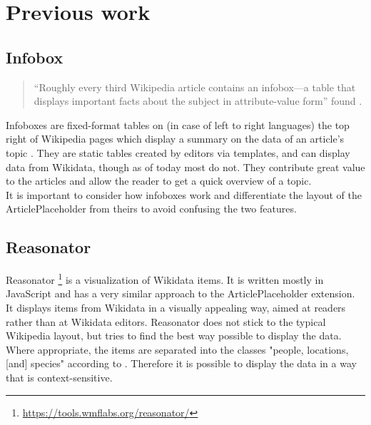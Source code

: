 \chapter{Previous work}
\section{Infobox} \label{infobox}
\begin{quote}
	``Roughly every third Wikipedia article contains an infobox---a table that displays important facts about the subject in attribute-value form'' found \citet[5]{infobox}.
\end{quote}
Infoboxes are fixed-format tables on (in case of left to right languages) the top right of Wikipedia pages which display a summary on the data of an article's topic \citep{wiki:05}. They are static tables created by editors via templates, and can display data from Wikidata, though as of today most do not. They contribute great value to the articles and allow the reader to get a quick overview of a topic. \\
It is important to consider how infoboxes work and differentiate the layout of the ArticlePlaceholder from theirs to avoid confusing the two features.

\section{Reasonator}
Reasonator \footnote{\url{https://tools.wmflabs.org/reasonator/}} is a visualization of Wikidata items. It is written mostly in JavaScript and has a very similar approach to the ArticlePlaceholder extension. It displays items from Wikidata in a visually appealing way, aimed at readers rather than at Wikidata editors. Reasonator does not stick to the typical Wikipedia layout, but tries to find the best way possible to display the data. \\
Where appropriate, the items are separated into the classes  "people, locations, [and] species" according to \citet{wiki:06}. Therefore it is possible to display the data in a way that is context-sensitive. \\

